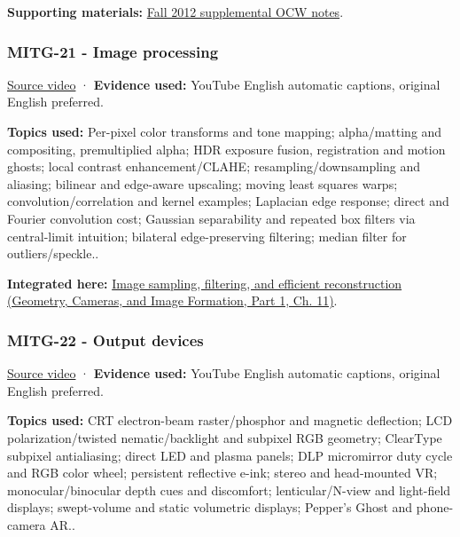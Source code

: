 \textbf{Supporting materials:} \href{https://ocw.mit.edu/courses/6-837-computer-graphics-fall-2012/pages/lecture-notes/}{Fall 2012 supplemental OCW notes}.

\subsubsection{MITG-21 - Image processing}\label{04-visual-computing-ii-ch036-mitg-21---image-processing}

\hypertarget{04-visual-computing-ii-ch036-mitg-21---image-processing}{}

\href{https://www.youtube.com/watch?v=WWLxaVzkneI}{Source video} · \textbf{Evidence used:} YouTube English automatic captions, original English preferred.

\textbf{Topics used:} Per-pixel color transforms and tone mapping; alpha/matting and compositing, premultiplied alpha; HDR exposure fusion, registration and motion ghosts; local contrast enhancement/CLAHE; resampling/downsampling and aliasing; bilinear and edge-aware upscaling; moving least squares warps; convolution/correlation and kernel examples; Laplacian edge response; direct and Fourier convolution cost; Gaussian separability and repeated box filters via central-limit intuition; bilateral edge-preserving filtering; median filter for outliers/speckle..

\textbf{Integrated here:} \href{../03-Geometry-Cameras-and-Image-Formation-P01/main.pdf\#03-visual-computing-i-ch004-image-sampling-filtering-and-efficient-reconstruction}{Image sampling, filtering, and efficient reconstruction (Geometry, Cameras, and Image Formation, Part 1, Ch. 11)}.

\subsubsection{MITG-22 - Output devices}\label{04-visual-computing-ii-ch036-mitg-22---output-devices}

\hypertarget{04-visual-computing-ii-ch036-mitg-22---output-devices}{}

\href{https://www.youtube.com/watch?v=Z5693mG_iCE}{Source video} · \textbf{Evidence used:} YouTube English automatic captions, original English preferred.

\textbf{Topics used:} CRT electron-beam raster/phosphor and magnetic deflection; LCD polarization/twisted nematic/backlight and subpixel RGB geometry; ClearType subpixel antialiasing; direct LED and plasma panels; DLP micromirror duty cycle and RGB color wheel; persistent reflective e-ink; stereo and head-mounted VR; monocular/binocular depth cues and discomfort; lenticular/N-view and light-field displays; swept-volume and static volumetric displays; Pepper's Ghost and phone-camera AR..

